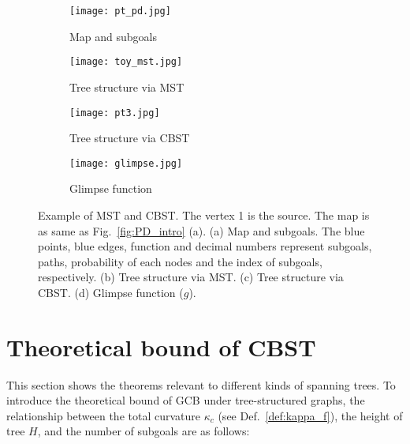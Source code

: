 \begin{figure}[htbp]
 \begin{center}
\begin{subfigure}{.44\textwidth}
  \centering
  \texttt{[image: pt\_pd.jpg]}
  \caption{Map and subgoals}
\end{subfigure}
\begin{subfigure}{.50\textwidth}
  \centering
  \texttt{[image: toy\_mst.jpg]}
  \caption{Tree structure via MST}
\end{subfigure}
\begin{subfigure}{.50\textwidth}
  \centering
  \texttt{[image: pt3.jpg]}
  \caption{Tree structure via CBST}
\end{subfigure}
\begin{subfigure}{.44\textwidth}
  \centering
  \texttt{[image: glimpse.jpg]}
  \caption{Glimpse function}
\end{subfigure}
\caption{Example of MST and CBST.
The vertex 1 is the source.
The map is as same as Fig.~\ref{fig:PD_intro} (a).
(a) Map and subgoals.
The blue points, blue edges, function and decimal numbers represent subgoals, paths, probability of each nodes and the index of subgoals, respectively.
(b) Tree structure via MST.
(c) Tree structure via CBST.
(d) Glimpse function ($g$).
}
\label{fig:GCB_CBST_ex}
 \end{center}
 \end{figure}



\section{Theoretical bound of CBST}
This section shows the theorems relevant to different kinds of spanning trees.
To introduce the theoretical bound of GCB under tree-structured graphs,
the relationship between the total curvature $\kappa_c$ (see Def.~\ref{def:kappa_f}), the height of tree $H$, and the number of subgoals are as follows:

%
%
%

